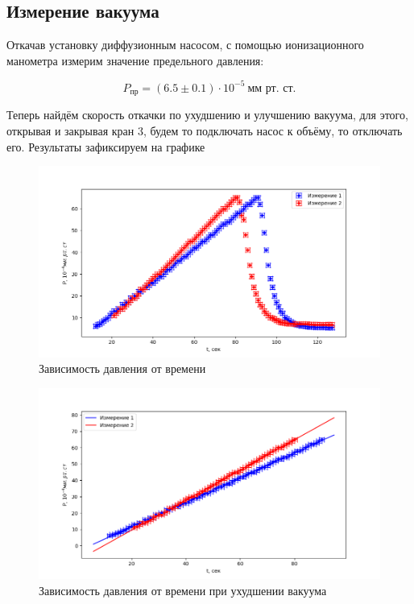 \documentclass[a4paper]{article}
\begin{document}
\subsection{Измерение вакуума}

Откачав установку диффузионным насосом, с помощью ионизационного манометра 
измерим значение предельного давления:

\begin{equation}
    P_\text{пр} = (6.5 \pm 0.1) \cdot 10^{-5} \ \text{мм рт. ст.}
\end{equation}

Теперь найдём скорость откачки по ухудшению и улучшению вакуума,
для этого, открывая и закрывая кран 3, будем то подключать насос к
объёму, то отключать его. Результаты зафиксируем на графике

\begin{figure}[h]
    \includegraphics[scale=0.7]{Измерения1.png}
    \caption{Зависимость давления от времени}
\end{figure}

\begin{figure}[h]
    \includegraphics[scale=0.7]{Измерения2.png}
    \caption{Зависимость давления от времени при ухудшении вакуума}
\end{figure}
\end{document}
